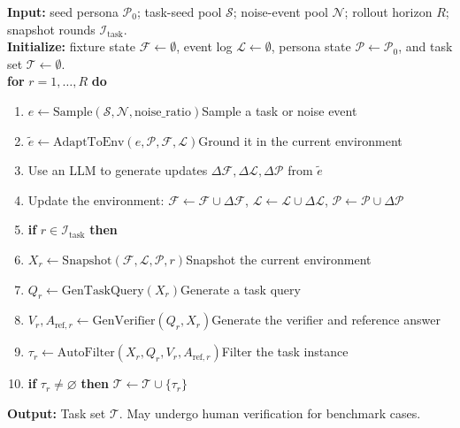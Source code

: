 \documentclass{article}
\begin{document}
\begin{algorithm}[t]
  \caption{Automated task generation pipeline.}
  \label{alg:algo}
  \small
  \textbf{Input:} seed persona $\mathcal{P}_0$; task-seed pool $\mathcal{S}$; noise-event pool $\mathcal{N}$; rollout horizon $R$; snapshot rounds $\mathcal{I}_{\mathrm{task}}$.\\
  \textbf{Initialize:} fixture state $\mathcal{F}\!\leftarrow\!\emptyset$, event log $\mathcal{L}\!\leftarrow\!\emptyset$, persona state $\mathcal{P}\!\leftarrow\!\mathcal{P}_0$, and task set $\mathcal{T}\!\leftarrow\!\emptyset$.\\
  \textbf{for} $r = 1,\dots,R$ \textbf{do}
  \begin{enumerate}
    \itemsep0.1em
    \item $e\!\leftarrow\!\mathrm{Sample}(\mathcal{S}, \mathcal{N}, \mathrm{noise\_ratio})$\hfill Sample a task or noise event
    \item $\tilde{e}\!\leftarrow\!\mathrm{AdaptToEnv}(e, \mathcal{P}, \mathcal{F}, \mathcal{L})$\hfill Ground it in the current environment
    \item Use an LLM to generate updates $\Delta\mathcal{F}, \Delta\mathcal{L}, \Delta\mathcal{P}$ from $\tilde{e}$
    \item Update the environment: $\mathcal{F}\!\leftarrow\!\mathcal{F} \cup \Delta\mathcal{F}$, $\mathcal{L}\!\leftarrow\!\mathcal{L} \cup \Delta\mathcal{L}$, $\mathcal{P}\!\leftarrow\!\mathcal{P} \cup \Delta\mathcal{P}$
    \item \textbf{if} $r \in \mathcal{I}_{\mathrm{task}}$ \textbf{then}
    \item[] \hspace*{2em}$X_r\!\leftarrow\!\mathrm{Snapshot}(\mathcal{F}, \mathcal{L}, \mathcal{P}, r)$\hfill Snapshot the current environment
    \item[] \hspace*{2em}$Q_r\!\leftarrow\!\mathrm{GenTaskQuery}(X_r)$\hfill Generate a task query
    \item[] \hspace*{2em}$V_r, A_{\mathrm{ref},r}\!\leftarrow\!\mathrm{GenVerifier}(Q_r, X_r)$\hfill Generate the verifier and reference answer
    \item[] \hspace*{2em}$\tau_r\!\leftarrow\!\mathrm{AutoFilter}(X_r, Q_r, V_r, A_{\mathrm{ref},r})$\hfill Filter the task instance
    \item[] \hspace*{2em}\textbf{if} $\tau_r \neq \varnothing$ \textbf{then} $\mathcal{T}\!\leftarrow\!\mathcal{T} \cup \{\tau_r\}$
  \end{enumerate}
  \textbf{Output:} Task set $\mathcal{T}.$ \hfill May undergo human verification for benchmark cases.\\
\end{algorithm}
\end{document}
